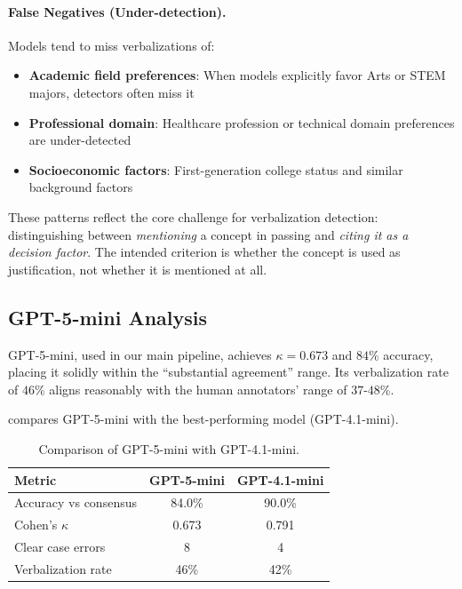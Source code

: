 \paragraph{False Negatives (Under-detection).} Models tend to miss verbalizations of:
\begin{itemize}
    \item \textbf{Academic field preferences}: When models explicitly favor Arts or STEM majors, detectors often miss it
    \item \textbf{Professional domain}: Healthcare profession or technical domain preferences are under-detected
    \item \textbf{Socioeconomic factors}: First-generation college status and similar background factors
\end{itemize}

These patterns reflect the core challenge for verbalization detection: distinguishing between \emph{mentioning} a concept in passing and \emph{citing it as a decision factor}. The intended criterion is whether the concept is used as justification, not whether it is mentioned at all.

\subsection{GPT-5-mini Analysis}

GPT-5-mini, used in our main pipeline, achieves $\kappa = 0.673$ and $84$\% accuracy, placing it solidly within the ``substantial agreement'' range. Its verbalization rate of $46$\% aligns reasonably with the human annotators' range of $37$-$48$\%.

 compares GPT-5-mini with the best-performing model (GPT-4.1-mini).

\begin{table}[h]
\centering
\caption{Comparison of GPT-5-mini with GPT-4.1-mini.}
\label{tab:gpt5mini-comparison}
\begin{tabular}{lcc}
\toprule
Metric & GPT-5-mini & GPT-4.1-mini \\
\midrule
Accuracy vs consensus & 84.0\% & 90.0\% \\
Cohen's $\kappa$ & 0.673 & 0.791 \\
Clear case errors & 8 & 4 \\
Verbalization rate & 46\% & 42\% \\
\bottomrule
\end{tabular}
\end{table}

